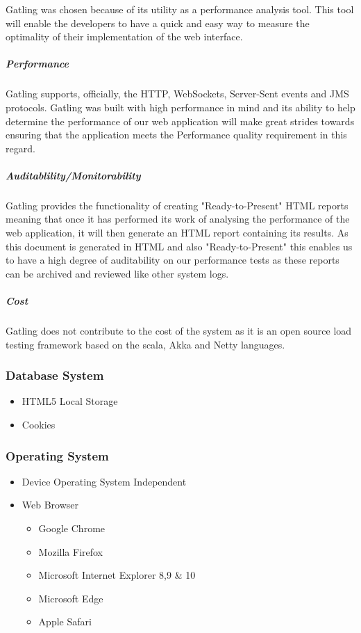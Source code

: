 \documentclass[a4paper,10pt]{article}
\begin{document}
\begin{itemize}
			Gatling was chosen because of its utility as a performance analysis tool. This tool will enable the developers to have a quick and easy way to measure the optimality of their implementation of the web interface.
			\subparagraph{Performance}
			Gatling supports, officially, the HTTP, WebSockets, Server-Sent events and JMS protocols. Gatling was built with high performance in mind and its ability to help determine the performance of our web application will make great strides towards ensuring that the application meets the Performance quality requirement in this regard.
			\subparagraph{Auditablility/Monitorability}
			Gatling provides the functionality of creating "Ready-to-Present" HTML reports meaning that once it has performed its work of analysing the performance of the web application, it will then generate an HTML report containing its results. As this document is generated in HTML and also "Ready-to-Present" this enables us to have a high degree of auditability on our performance tests as these reports can be archived and reviewed like other system logs.

			\subparagraph{Cost}
			Gatling does not contribute to the cost of the system as it is an open source load testing framework based on the scala, Akka and Netty languages.
	\end{itemize}

\subsubsection{Database System}
	\begin{itemize}
		\item HTML5 Local Storage
		\item Cookies
	\end{itemize}

\subsubsection{Operating System}
	\begin{itemize}
		\item Device Operating System Independent
		\item Web Browser
		\begin{itemize}
			\item Google Chrome
			\item Mozilla Firefox
			\item Microsoft Internet Explorer 8,9 \& 10
			\item Microsoft Edge
			\item Apple Safari
		\end{itemize}
	\end{itemize}
\end{document}

